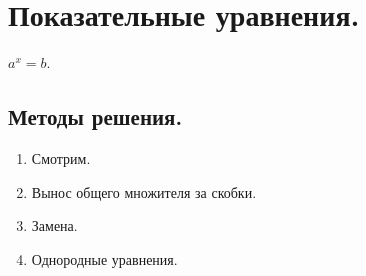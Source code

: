 \documentclass[12pt]{article}
\begin{document}
	\section{Показательные уравнения.}
	$a^x = b$.
	\subsection{Методы решения.}
	\begin{enumerate}
		\item Смотрим.
		\item Вынос общего множителя за скобки.
		\item Замена.
		\item Однородные уравнения.
	\end{enumerate}
\end{document}
